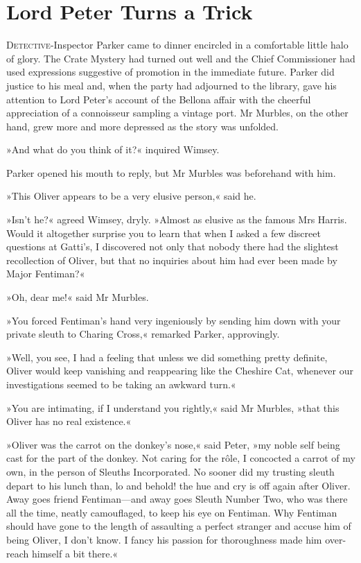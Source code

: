 \chapter{Lord Peter Turns a Trick}
\lettrine[lines=4]{D}{etective}-Inspector Parker came to dinner encircled in a comfortable little halo of glory. The Crate Mystery had turned out well and the Chief Commissioner had used expressions suggestive of promotion in the immediate future. Parker did justice to his meal and, when the party had adjourned to the library, gave his attention to Lord Peter's account of the Bellona affair with the cheerful appreciation of a connoisseur sampling a vintage port. Mr Murbles, on the other hand, grew more and more depressed as the story was unfolded.

»And what do you think of it?« inquired Wimsey.

Parker opened his mouth to reply, but Mr Murbles was beforehand with him.

»This Oliver appears to be a very elusive person,« said he.

»Isn't he?« agreed Wimsey, dryly. »Almost as elusive as the famous Mrs Harris. Would it altogether surprise you to learn that when I asked a few discreet questions at Gatti's, I discovered not only that nobody there had the slightest recollection of Oliver, but that no inquiries about him had ever been made by Major Fentiman?«

»Oh, dear me!« said Mr Murbles.

»You forced Fentiman's hand very ingeniously by sending him down with your private sleuth to Charing Cross,« remarked Parker, approvingly.

»Well, you see, I had a feeling that unless we did something pretty definite, Oliver would keep vanishing and reappearing like the Cheshire Cat, whenever our investigations seemed to be taking an awkward turn.«

»You are intimating, if I understand you rightly,« said Mr Murbles, »that this Oliver has no real existence.«

»Oliver was the carrot on the donkey's nose,« said Peter, »my noble self being cast for the part of the donkey. Not caring for the rôle, I concocted a carrot of my own, in the person of Sleuths Incorporated. No sooner did my trusting sleuth depart to his lunch than, lo and behold! the hue and cry is off again after Oliver. Away goes friend Fentiman—and away goes Sleuth Number Two, who was there all the time, neatly camouflaged, to keep his eye on Fentiman. Why Fentiman should have gone to the length of assaulting a perfect stranger and accuse him of being Oliver, I don't know. I fancy his passion for thoroughness made him over-reach himself a bit there.«

